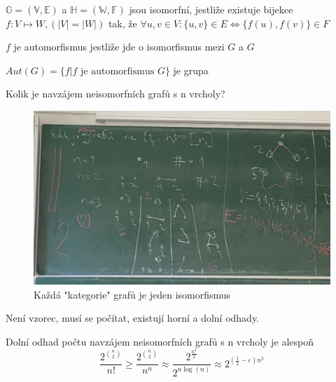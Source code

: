 \documentclass[../main.tex]{subfiles}
\begin{document}
\begin{definition}
    $\mathbb{G} = (\mathbb{V}, \mathbb{E})$ a $\mathbb{H} = (\mathbb{W}, \mathbb{F})$ jsou isomorfní, jestliže existuje bijekce 
    $f: V \mapsto W, (|V| = |W|)$ tak, že $\forall u,v \in V: \{u, v\}\in E \Leftrightarrow \{ f(u), f(v) \} \in F$
\end{definition}


\begin{definition}
    $f$ je automorfismus jestliže jde o isomorfismus mezi $G$ a $G$ 
\end{definition}

\begin{remark}
    $Aut(G) = \{f | f\text{ je automorfismus }G\}$ je grupa
\end{remark}


\begin{example}
    Kolik je navzájem neisomorfních grafů s n vrcholy?

    \begin{figure}[h]
        \centering        
        \includegraphics[width=\textwidth/2]{images/27-9-pocetgrafu.png}
        \caption*{Každá "kategorie" grafů je jeden isomorfismus}
    \end{figure} 

    Není vzorec, musí se počítat, existují horní a dolní odhady.
\end{example}

\begin{claim}
Dolní odhad počtu navzájem neisomorfních grafů s n vrcholy je alespoň
\begin{equation}
    \frac{2^{\binom{n}{2}}}{n!} \geq \frac{2^{\binom{n}{2}}}{n^n} \approx \frac{2^{\frac{n^2}{2}}}{2^{n \log(n)}} \approx 2^{(\frac{1}{2} - \varepsilon)n^2} 
\end{equation}
\end{claim}
\end{document}
